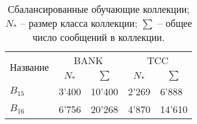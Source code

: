 \begin{table}[htp!]
\centering
\caption{Сбалансированные обучающие коллекции;
    $N_*$ -- размер класса коллекции;
    $\sum$ -- общее число сообщений в коллекции.
}
\label{table:balancedTrainCollections}
\begin{tabular}{lllll}
\hline
\multirow{2}{*}{Название} & \multicolumn{2}{c}{BANK}                               & \multicolumn{2}{c}{TCC}                                \\
                          & \multicolumn{1}{c}{$N_*$} & \multicolumn{1}{c}{$\sum$} & \multicolumn{1}{c}{$N_*$} & \multicolumn{1}{c}{$\sum$} \\ \hline
$B_{15}$                & 3'400                     & 10'400                     & 2'269                     & 6'888                      \\
$B_{16}$                & 6'756                     & 20'268                     & 4'870                     & 14'610                     \\ \hline
\end{tabular}
\end{table}
